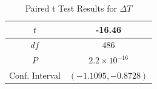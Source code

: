 \begin{table}[ht]
 \begin{centering}
 \begin{tabular}{|c|c|} 
 \hline
  $t$ & -16.46 \\ 
 \hline
 $df$ & 486 \\
  \hline
 $P$ & $2.2 \times 10^{-16}$ \\ 
  \hline
 Conf. Interval & $(-1.1095, -0.8728)$ \\ 
 \hline
 \end{tabular}
 \caption{Paired t Test Results for $\Delta T$}
 \label{tab:t_test_results}
 \end{centering}
\end{table}